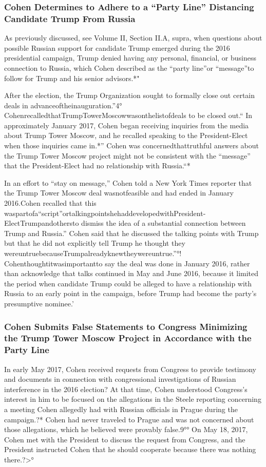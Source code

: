 \subsubsection{Cohen Determines to Adhere to a “Party Line” Distancing Candidate Trump From Russia}

As previously discussed, see Volume II, Section II.A, supra, when questions about possible Russian support for candidate Trump emerged during the 2016 presidential campaign, Trump denied having any personal, financial, or business connection to Russia, which Cohen described as the “party line”or “message”to follow for Trump and his senior advisors.*"

After the election, the Trump Organization sought to formally close out certain deals in advanceoftheinauguration.”4° CohenrecalledthatTrumpTowerMoscowwasonthelistofdeals to be closed out.“ In approximately January 2017, Cohen began receiving inquiries from the media about Trump Tower Moscow, and he recalled speaking to the President-Elect when those inquiries came in.*” Cohen was concernedthattruthful answers about the Trump Tower Moscow project might not be consistent with the “message” that the President-Elect had no relationship with Russia.“*

In an effort to “stay on message,” Cohen told a New York Times reporter that the Trump Tower Moscow deal wasnotfeasible and had ended in January 2016.Cohen recalled that this waspartofa“script”ortalkingpointshehaddevelopedwithPresident-ElectTrumpandothersto
dismiss the idea of a substantial connection between Trump and Russia.” Cohen said that he discussed the talking points with Trump but that he did not explicitly tell Trump he thought they wereuntruebecauseTrumpalreadyknewtheywereuntrue.”°! Cohenthoughtitwasimportantto say the deal was done in January 2016, rather than acknowledge that talks continued in May and June 2016, because it limited the period when candidate Trump could be alleged to have a relationship with Russia to an early point in the campaign, before Trump had become the party's presumptive nominee.'

\subsubsection{Cohen Submits False Statements to Congress Minimizing the Trump Tower Moscow Project in Accordance with the Party Line}

In early May 2017, Cohen received requests from Congress to provide testimony and documents in connection with congressional investigations of Russian interference in the 2016 election? At that time, Cohen understood Congress's interest in him to be focused on the allegations in the Steele reporting concerning a meeting Cohen allegedly had with Russian officials in Prague during the campaign.?* Cohen had never traveled to Prague and was not concerned about those allegations, which he believed were provably false.9°° On May 18, 2017, Cohen met with the President to discuss the request from Congress, and the President instructed Cohen that he should cooperate because there was nothing there.?>°

